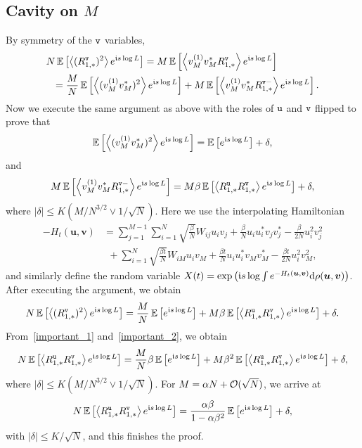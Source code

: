 \documentclass[final,12pt]{colt2018} %
\newcommand{\utt}{\textup{\texttt{u}}}
\newcommand{\vtt}{\textup{\texttt{v}}}
\renewcommand{\u}{\bm{u}}
\renewcommand{\v}{\bm{v}}
\begin{document}
\subsection{Cavity on $M$}
By symmetry of the $\vtt$ variables,  
\begin{align*} 
&N\E\left[\left\langle (R^{\vtt}_{1,*})^2\right\rangle e^{\imnb s \log L}\right] = M\E\left[\left\langle v_M^{(1)}v_M^{*}R^{\vtt}_{1,*}\right\rangle e^{\imnb s \log L}\right]\\
&~~= \frac{M}{N}\E\left[\left\langle (v_M^{(1)}v_M^{*})^2\right\rangle e^{\imnb s \log L}\right] +M\E\left[\left\langle v_M^{(1)}v_M^{*}R^{\vtt -}_{1,*}\right\rangle e^{\imnb s \log L}\right]. 
\end{align*}
Now we execute the same argument as above with the roles of $\utt$ and $\vtt$ flipped to prove that 
\[\operatorname{\mathbb{E}}\left[\left\langle (v_M^{(1)}v_M^{*})^2\right\rangle e^{\mathfrak{i} s \log L}\right] = \operatorname{\mathbb{E}}\left[e^{\mathfrak{i} s \log L}\right] +\delta, \]
and
\[M\E\left[\left\langle v_M^{(1)}v_M^{*}R^{\vtt -}_{1,*}\right\rangle e^{\imnb s \log L}\right] = M\beta\E\left[\left\langle R^{\utt}_{1,*}R^{\vtt}_{1,*}\right\rangle e^{\imnb s \log L}\right] +\delta, \]
where $|\delta| \le K (M/N^{3/2} \vee 1/\sqrt{N})$. Here we use the interpolating Hamiltonian
\begin{align*}
-H_t(\u,\v) &= \sum_{j=1}^{ M-1} \sum_{i=1}^N \sqrt{\frac{\beta}{N}}W_{ij}u_i v_j + \frac{\beta}{N}u_iu_i^*v_jv_j^*- \frac{\beta}{2N}u_i^2v_j^2 \\
&~~+  \sum_{i=1}^N \sqrt{\frac{\beta t}{N}}W_{iM}u_i v_M + \frac{\beta t}{N}u_iu_i^*v_Mv_M^*- \frac{\beta t}{2N}u_i^2v_M^2,
\end{align*}
and similarly define the random variable $X(t) = \exp\big(\imnb s \log \int e^{-H_t(\u,\v)} \rmd \rho(\u,\v)\big)$.
After executing the argument, we obtain 
\begin{equation}\label{important_2}
N\E\left[\left\langle (R^{\vtt}_{1,*})^2\right\rangle e^{\imnb s \log L}\right]  = \frac{M}{N} \E\left[e^{\imnb s \log L}\right] + M\beta \E\left[\left\langle R^{\utt}_{1,*} R^{\vtt}_{1,*}\right\rangle e^{\imnb s \log L}\right] + \delta.
\end{equation}
From~\eqref{important_1} and~\eqref{important_2}, we obtain 
\[N\E\left[\left\langle R^{\utt}_{1,*} R^{\vtt}_{1,*}\right\rangle e^{\imnb s \log L}\right]  = \frac{M}{N} \beta \E\left[e^{\imnb s \log L}\right]  + M \beta^2 \E\left[\left\langle R^{\utt}_{1,*} R^{\vtt}_{1,*}\right\rangle e^{\imnb s \log L}\right] +\delta, \]
where $|\delta| \le K (M/N^{3/2} \vee 1/\sqrt{N})$. For $M= \alpha N + \mathcal{O}(\sqrt{N})$, we arrive at
\[N\E\left[\left\langle R^{\utt}_{1,*} R^{\vtt}_{1,*}\right\rangle e^{\imnb s \log L}\right]  = \frac{\alpha \beta}{1-\alpha \beta^2}\E\left[e^{\imnb s \log L}\right] + \delta,\]
with $|\delta| \le K/\sqrt{N}$, and this finishes the proof.
\end{document}
